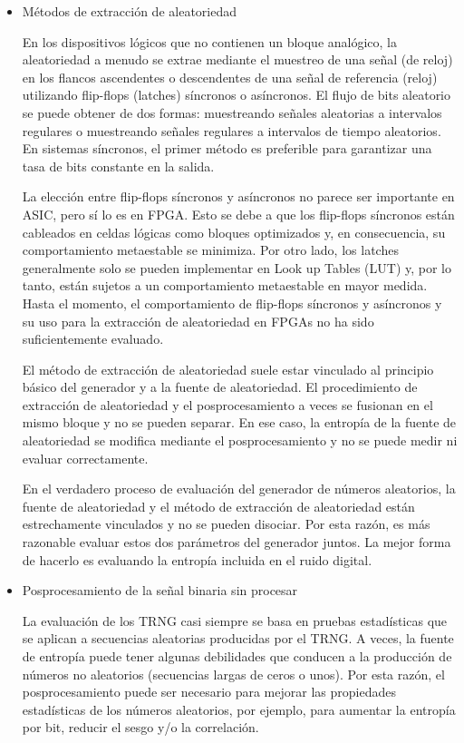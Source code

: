 \begin{itemize}
				\item Métodos de extracción de aleatoriedad
				
					En los dispositivos lógicos que no contienen un bloque analógico, la aleatoriedad a menudo se extrae mediante el muestreo de una señal (de reloj) en los flancos ascendentes o descendentes de una señal de referencia (reloj) utilizando flip-flops (latches) síncronos o asíncronos. El flujo de bits aleatorio se puede obtener de dos formas: muestreando señales aleatorias a intervalos regulares o muestreando señales regulares a intervalos de tiempo aleatorios. En sistemas síncronos, el primer método es preferible para garantizar una tasa de bits constante en la salida.
					
					La elección entre flip-flops síncronos y asíncronos no parece ser importante en ASIC, pero sí lo es en FPGA. Esto se debe a que los flip-flops síncronos están cableados en celdas lógicas como bloques optimizados y, en consecuencia, su comportamiento metaestable se minimiza. Por otro lado, los latches generalmente solo se pueden implementar en Look up Tables (LUT) y, por lo tanto, están sujetos a un comportamiento metaestable en mayor medida. Hasta el momento, el comportamiento de flip-flops síncronos y asíncronos y su uso para la extracción de aleatoriedad en FPGAs no ha sido suficientemente evaluado. 
					
					El método de extracción de aleatoriedad suele estar vinculado al principio básico del generador y a la fuente de aleatoriedad. El procedimiento de extracción de aleatoriedad y el posprocesamiento a veces se fusionan en el mismo bloque y no se pueden separar. En ese caso, la entropía de la fuente de aleatoriedad se modifica mediante el posprocesamiento y no se puede medir ni evaluar correctamente. 
					
					En el verdadero proceso de evaluación del generador de números aleatorios, la fuente de aleatoriedad y el método de extracción de aleatoriedad están estrechamente vinculados y no se pueden disociar. Por esta razón, es más razonable evaluar estos dos parámetros del generador juntos. La mejor forma de hacerlo es evaluando la entropía incluida en el ruido digital.
					
				\item Posprocesamiento de la señal binaria sin procesar
					
					La evaluación de los TRNG casi siempre se basa en pruebas estadísticas que se aplican a secuencias aleatorias producidas por el TRNG. A veces, la fuente de entropía puede tener algunas debilidades que conducen a la producción de números no aleatorios (secuencias largas de ceros o unos). Por esta razón, el posprocesamiento puede ser necesario para mejorar las propiedades estadísticas de los números aleatorios, por ejemplo, para aumentar la entropía por bit, reducir el sesgo y/o la correlación. 
					

\end{itemize}

